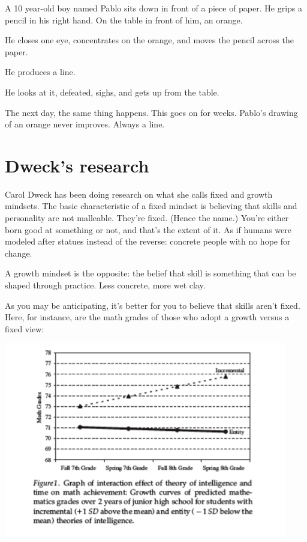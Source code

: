 A 10 year-old boy named Pablo sits down in front of a piece of paper. He grips a
pencil in his right hand. On the table in front of him, an orange.

He closes one eye, concentrates on the orange, and moves the pencil across the
paper.

He produces a line.

He looks at it, defeated, sighs, and gets up from the table.

The next day, the same thing happens. This goes on for weeks. Pablo's drawing of
an orange never improves. Always a line.

\section{Dweck's research}

Carol Dweck has been doing research on what she calls fixed and growth
mindsets. The basic characteristic of a fixed mindset is believing that skills
and personality are not malleable. They're fixed. (Hence the name.) You're either born good at
something or not, and that's the extent of it. As if humans were modeled after statues instead of the reverse: concrete people
with no hope for change.

A growth mindset is the opposite: the belief that skill is something that can be
shaped through practice. Less concrete, more wet clay.

As you may be anticipating, it's better for you to believe that skills aren't
fixed. Here, for instance, are the math grades of those who adopt a growth
versus a fixed view:

\includegraphics[width=\textwidth]{graphics/fixed-vs-growth-math-dweck}

